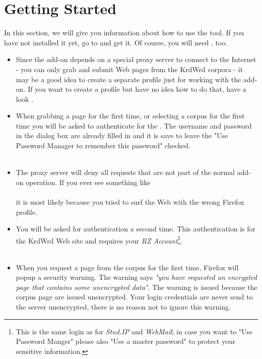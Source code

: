 \documentclass[12pt]{article}
\begin{document}
\section{Getting Started}
In this section, we will give you information about how to use the tool. If you have not installed it yet, go to  and get it. Of course, you will need , too. \\

\begin{itemize}
\item Since the add-on depends on a special proxy server to connect to the Internet - you can only grab and submit Web pages from the KrdWrd corpora - it may be a good idea to create a separate profile just for working with the add-on. If you want to create a profile but have no idea how to do that, have a look . \\
\item When grabbing a page for the first time, or selecting a corpus for the first time you will be asked to authenticate for the . The username and password in the dialog box are already filled in and it is save to leave the "Use Password Manager to remember this password" checked. \\
 \\

\item The proxy server will deny all requests that are not part of the normal add-on operation. If you ever see something like \\
 \\
it is most likely because you tried to surf the Web with the wrong Firefox profile. \\

\item You will be asked for authentication a second time. This authentication is for the KrdWrd Web site and requires your \emph{RZ Account}\footnote{This is the same login as for \emph{Stud.IP} and \emph{WebMail}; in case you want to "Use Password Manger" please also "Use a master password" to protect your sensitive information.} \\
 \\ 

\item When you request a page from the corpus for the first time, Firefox will popup a security warning. The warning says \emph{"you have requested an encrypted page that contains some unencrypted data"}. The warning is issued because the corpus page are issued unencrypted. Your login credentials are never send to the server unencrypted, there is no reason not to ignore this warning. \\

\end{itemize}
\end{document}
